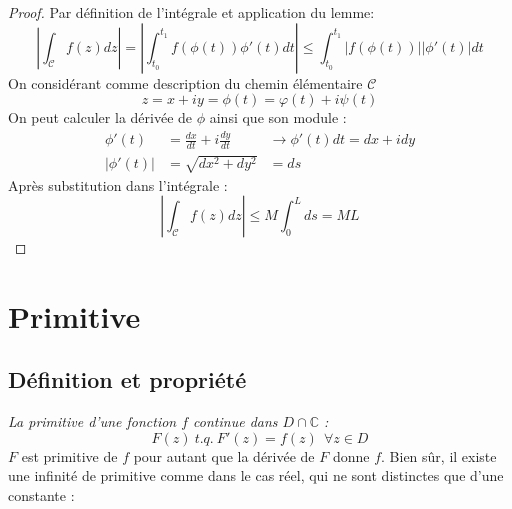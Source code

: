 \begin{proof}
	Par définition de l'intégrale et application du lemme:
	\begin{equation}
		\left|\int_\mathcal{C} f(z) dz\right| = \left|\int_{t_0}^{t_1} f(\phi(t))\phi'(t)
		dt\right| \leq \int_{t_0}^{t_1} |f(\phi(t))||\phi'(t)| dt
	\end{equation}
	On considérant comme description du chemin élémentaire $\mathcal{C}$ 
	\begin{equation}
		z = x+iy = \phi(t) = \varphi(t) + i\psi(t)
	\end{equation}
	On peut calculer la dérivée de $\phi$ ainsi que son module : 
	\begin{equation}
		\begin{array}{lll}
			\phi'(t)   & = \frac{dx}{dt} + i\frac{dy}{dt} & \rightarrow \phi'(t)dt= dx + idy \\
			|\phi'(t)| & = \sqrt{dx^2 + dy^2}             & = ds                             
		\end{array}
	\end{equation}
	Après substitution dans l'intégrale :
	\begin{equation}
		\left|\int_\mathcal{C} f(z) dz\right| \leq M\int_0^L ds = ML
	\end{equation}
\end{proof}
    
    
    
    
    
    
\section{Primitive}
\subsection{Définition et propriété}
\textit{La primitive d'une fonction $f$ continue dans $D \cap \mathbb{C}$ :}
\begin{equation}
	F(z)\ t.q.\ F'(z) = f(z)\ \ \forall z \in D
\end{equation}
$F$ est primitive de $f$ pour autant que la dérivée de $F$ donne $f$. Bien sûr,
il existe une infinité de primitive comme dans le cas réel, qui ne sont distinctes
que d'une constante :\\
    
